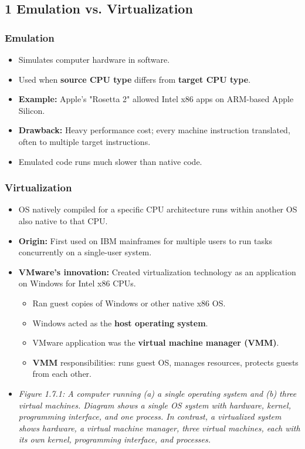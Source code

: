 \documentclass{article}
\begin{document}
\subsection*{1 Emulation vs. Virtualization}
\subsubsection*{Emulation}
\begin{itemize}
    \item Simulates computer hardware in software.
    \item Used when \textbf{source CPU type} differs from \textbf{target CPU type}.
    \item \textbf{Example:} Apple's "Rosetta 2" allowed Intel x86 apps on ARM-based Apple Silicon.
    \item \textbf{Drawback:} Heavy performance cost; every machine instruction translated, often to multiple target instructions.
    \item Emulated code runs much slower than native code.
\end{itemize}

\subsubsection*{Virtualization}
\begin{itemize}
    \item OS natively compiled for a specific CPU architecture runs within another OS also native to that CPU.
    \item \textbf{Origin:} First used on IBM mainframes for multiple users to run tasks concurrently on a single-user system.
    \item \textbf{VMware's innovation:} Created virtualization technology as an application on Windows for Intel x86 CPUs.
    \begin{itemize}
        \item Ran guest copies of Windows or other native x86 OS.
        \item Windows acted as the \textbf{host operating system}.
        \item VMware application was the \textbf{virtual machine manager (VMM)}.
        \item \textbf{VMM} responsibilities: runs guest OS, manages resources, protects guests from each other.
    \end{itemize}
    \item \textit{Figure 1.7.1: A computer running (a) a single operating system and (b) three virtual machines. Diagram shows a single OS system with hardware, kernel, programming interface, and one process. In contrast, a virtualized system shows hardware, a virtual machine manager, three virtual machines, each with its own kernel, programming interface, and processes.}
\end{itemize}
\end{document}
